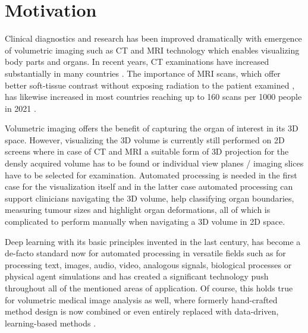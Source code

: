 \section{Motivation} %
    Clinical diagnostics and research has been improved dramatically with emergence of volumetric imaging such as \ac{CT} and \ac{MRI} technology which enables visualizing body parts and organs.
    In recent years, \ac{CT} examinations have increased substantially in many countries \citep{westmark2023increasing, masjedi2020european, martella2023diagnostic}. The importance of \ac{MRI} scans, which offer better soft-tissue contrast without exposing radiation to the patient examined \citep{martella2023diagnostic}, has likewise increased in most countries reaching up to 160 scans per 1000 people in 2021 \citep{statista2021number}. %

    Volumetric imaging offers the benefit of capturing the organ of interest in its \ac{3D} space. However, visualizing the \ac{3D} volume is currently still performed on \ac{2D} screens where in case of \ac{CT} and \ac{MRI} a suitable form of \ac{3D} projection for the densly acquired volume has to be found or individual view planes / imaging slices have to be selected for examination. Automated processing is needed in the first case for the visualization itself and in the latter case automated processing can support clinicians navigating the \ac{3D} volume, help classifying organ boundaries, measuring tumour sizes and highlight organ deformations, all of which is complicated to perform manually when navigating a \ac{3D} volume in \ac{2D} space.

    Deep learning with its basic principles invented in the last century, has become a de-facto standard now for automated processing in versatile fields such as for processing text, images, audio, video, analogous signals, biological processes or physical agent simulations
    \citep{%
        ouyang2022training, %
        kirillov2023segment, %
        birtchnell2018listening,%
        huang2020movienet,%
        sahoo2020machine,%
        jumper2021highly,%
        makoviychuk2021isaac,%
    }
    and has created a significant technology push throughout all of the mentioned areas of application.
    Of course, this holds true for volumetric medical image analysis as well, where formerly hand-crafted method design is now combined or even entirely replaced with data-driven, learning-based methods \citep{xx}.

